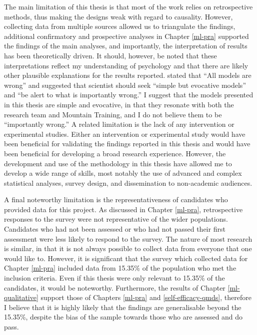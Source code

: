 \documentclass[
  12pt,
  a4paper,
]{book}
\begin{document}
The main limitation of this thesis is that most of the work relies on retrospective methods, thus making the designs weak with regard to causality. However, collecting data from multiple sources allowed us to triangulate the findings, additional confirmatory and prospective analyses in Chapter \ref{ml-pra} supported the findings of the main analyses, and importantly, the interpretation of results has been theoretically driven. It should, however, be noted that these interpretations reflect my understanding of psychology and that there are likely other plausible explanations for the results reported. \citet{Box1976} stated that ``All models are wrong'' and suggested that scientist should seek ``simple but evocative models'' and ``be alert to what is importantly wrong.'' I suggest that the models presented in this thesis are simple and evocative, in that they resonate with both the research team and Mountain Training, and I do not believe them to be ``importantly wrong.'' A related limitation is the lack of any intervention or experimental studies. Either an intervention or experimental study would have been beneficial for validating the findings reported in this thesis and would have been beneficial for developing a broad research experience. However, the development and use of the methodology in this thesis have allowed me to develop a wide range of skills, most notably the use of advanced and complex statistical analyses, survey design, and dissemination to non-academic audiences.

A final noteworthy limitation is the representativeness of candidates who provided data for this project. As discussed in Chapter \ref{ml-pra}, retrospective responses to the survey were not representative of the wider populations. Candidates who had not been assessed or who had not passed their first assessment were less likely to respond to the survey. The nature of most research is similar, in that it is not always possible to collect data from everyone that one would like to. However, it is significant that the survey which collected data for Chapter \ref{ml-pra} included data from 15.35\% of the population who met the inclusion criteria. Even if this thesis were only relevant to 15.35\% of the candidates, it would be noteworthy. Furthermore, the results of Chapter \ref{ml-qualitative} support those of Chapters \ref{ml-pra} and \ref{self-efficacy-qmds}, therefore I believe that it is highly likely that the findings are generalisable beyond the 15.35\%, despite the bias of the sample towards those who are assessed and do pass.
\end{document}
